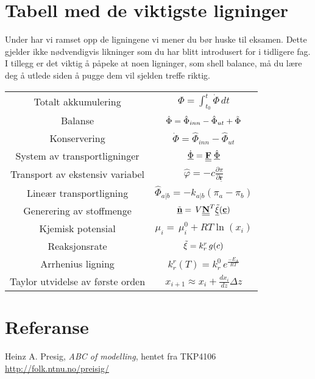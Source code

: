 \clearpage
\section{Tabell med de viktigste ligninger}
Under har vi ramset opp de ligningene vi mener du bør huske til eksamen. Dette gjelder ikke nødvendigvis likninger som du har blitt introdusert for i tidligere fag. I tillegg er det viktig å påpeke at noen ligninger, som shell balance, må du lære deg å utlede siden å pugge dem vil sjelden treffe riktig. 
\begin{table}[H]
    \centering
    \begin{tabular}{c|c}
        Totalt akkumulering & $\Phi = \int_{t_0}^{t}\dot{\Phi}\,dt $  \\[0.2cm]
         Balanse  & $\dot{\Phi} = \hat{\Phi}_{inn} - \hat{\Phi}_{ut} + \Tilde{\Phi}$ \\[0.2cm]
         Konservering & $\dot{\Phi} = \hat{\Phi}_{inn} - \hat{\Phi}_{ut} $\\[0.2cm]
         System av transportligninger & $\underline{\dot{\Phi}} = \textbf{\underline{\underline{F}}}\hspace{0.1cm}\underline{\hat{\Phi}}$ \\[0.2cm]
         Transport av ekstensiv variabel & $\hat{\varphi} = -c\frac{\partial \pi}{\partial \underline{\textbf{r}}}$ \\[0.2cm]
         Lineær transportligning & $\hat{\Phi}_{a|b} = -k_{a|b}(\pi_a-\pi_b)$ \\[0.2cm] 
         Generering av stoffmenge & $\underline{\Tilde{\textbf{n}}}=\,V\underline{\underline{\textbf{N}}}^T\underline{\Tilde{\xi}}(\underline{\textbf{c}})$ \\[0.2cm]
         Kjemisk potensial & $\mu_i =\, \mu_{i}^0 + RT\ln (x_i)$ \\[0.2cm]
         Reaksjonsrate & $\Tilde{\xi} = k^r_r\,g(c)$ \\[0.2cm] 
         Arrhenius ligning & $k^r_r(T) =k^0_r\,e^{\frac{-E_{A}}{RT}}$ \\[0.2cm]
         
         Taylor utvidelse av første orden & $x_{i+1} \approx x_i + \frac{dx_i}{dz}\Delta z$ \\[0.2cm]
    \end{tabular}
    \label{tab:my_label}
\end{table}

\appendix
\section{Referanse}
Heinz A. Presig, \textit{ABC of modelling}, hentet fra TKP4106 \url{http://folk.ntnu.no/preisig/}